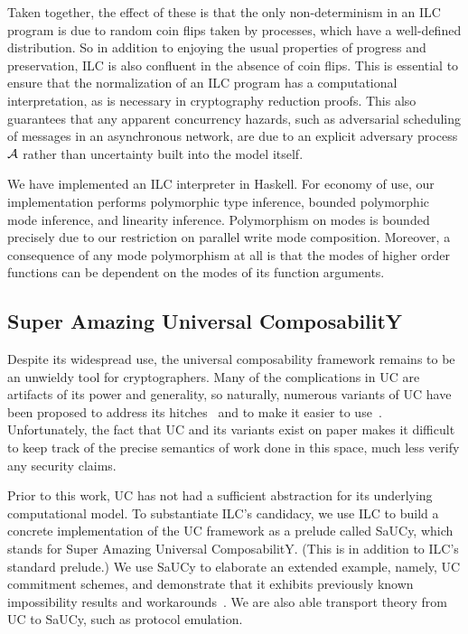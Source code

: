 Taken together, the effect of these is that the only non-determinism in an ILC
program is due to random coin flips taken by processes, which have a
well-defined distribution. So in addition to enjoying the usual properties of
progress and preservation, ILC is also confluent in the absence of coin
flips. This is essential to ensure that the normalization of an ILC program has
a computational interpretation, as is necessary in cryptography reduction
proofs. This also guarantees that any apparent concurrency hazards, such as
adversarial scheduling of messages in an asynchronous network, are due to an
explicit adversary process $\mathcal{{A}}$ rather than uncertainty built into the model
itself.

We have implemented an ILC interpreter in Haskell. For economy of use, our
implementation performs polymorphic type inference, bounded polymorphic mode
inference, and linearity inference. Polymorphism on modes is bounded precisely
due to our restriction on parallel write mode composition. Moreover, a
consequence of any mode polymorphism at all is that the modes of higher order
functions can be dependent on the modes of its function arguments.

\subsection{Super Amazing Universal ComposabilitY}

Despite its widespread use, the universal composability framework remains to be
an unwieldy tool for cryptographers. Many of the complications in UC are
artifacts of its power and generality, so naturally, numerous variants of UC
have been proposed to address its hitches~\cite{backes2007reactive,
  hofheinz2015gnuc, canetti2007universally, canetti2003universal} and to make it
easier to use~\cite{canetti2015simpler}. Unfortunately, the fact that UC and its
variants exist on paper makes it difficult to keep track of the precise
semantics of work done in this space, much less verify any security claims.

Prior to this work, UC has not had a sufficient abstraction for its underlying
computational model. To substantiate ILC's candidacy, we use ILC to build a
concrete implementation of the UC framework as a prelude called SaUCy, which
stands for Super Amazing Universal ComposabilitY. (This is in addition to ILC's
standard prelude.) We use SaUCy to elaborate an extended example, namely, UC
commitment schemes, and demonstrate that it exhibits previously known
impossibility results and workarounds~\cite{canetti2001commitments}. We are also
able transport theory from UC to SaUCy, such as protocol emulation.

